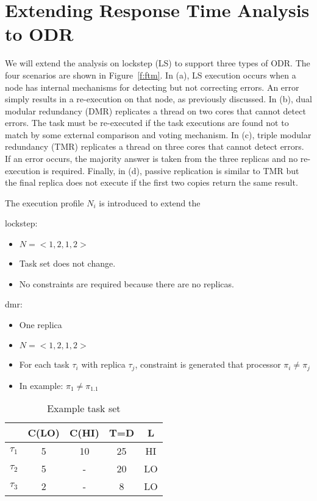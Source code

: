 \section{Extending Response Time Analysis to ODR}

	We will extend the analysis on lockstep (LS) to support three types of ODR. The four scenarios are shown in Figure~\ref{f:ftm}. 
	In (a), LS execution occurs when a node has internal mechanisms for detecting but not correcting errors. 
	An error simply results in a re-execution on that node, as previously discussed. 	
	In (b), dual modular redundancy (DMR) replicates a thread on two cores that cannot detect errors. 
	The task must be re-executed if the task executions are found not to match by some external comparison and voting mechanism.
	In (c), triple modular redundancy (TMR) replicates a thread on three cores that cannot detect errors. 
	If an error occurs, the majority answer is taken from the three replicas and no re-execution is required.
	Finally, in (d), passive replication is similar to TMR but the final replica does not execute if the first two copies return the same result. 
	
	The execution profile $N_i$ is introduced to extend the  	

lockstep:
\begin{itemize}
  \item $N=<1,2,1,2>$
  \item Task set does not change.
  \item No constraints are required because there are no replicas.
\end{itemize}

dmr:
\begin{itemize}
  \item One replica
  \item $N=<1,2,1,2>$
  \item For each task $\tau_i$ with replica $\tau_j$, constraint is generated that processor $\pi_i \ne \pi_j$
  \item In example: $\pi_1 \ne \pi_{1.1}$
\end{itemize}
\begin{table}
\centering
\caption{Example task set}
\begin{tabular}{@{}l|cccc@{}}
\toprule
		& C(LO) & C(HI) & T=D & L 	 \\\bottomrule
$\tau_1$ & 5 & 10 & 25 & HI  \\
$\tau_2$ & 5 & - & 20 & LO  \\
$\tau_3$ & 2 & - & 8 & LO  \\
\end{tabular}
\end{table}


